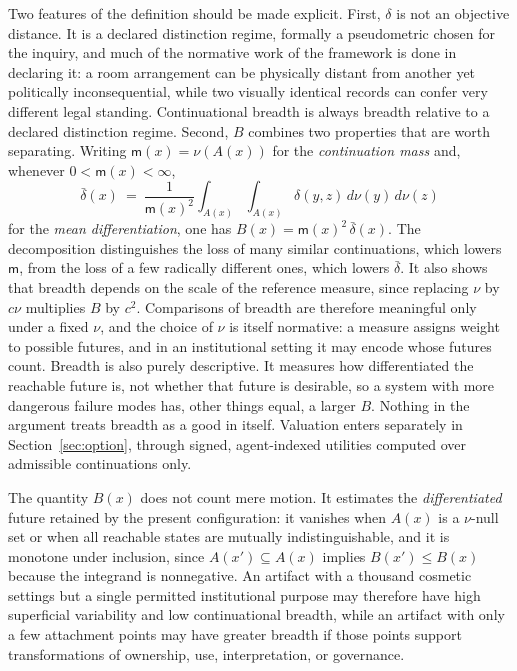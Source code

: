 Two features of the definition should be made explicit. First, $\delta$ is not an objective distance. It is a declared distinction regime, formally a pseudometric chosen for the inquiry, and much of the normative work of the framework is done in declaring it: a room arrangement can be physically distant from another yet politically inconsequential, while two visually identical records can confer very different legal standing. Continuational breadth is always breadth relative to a declared distinction regime. Second, $B$ combines two properties that are worth separating. Writing $\mathsf{m}(x)=\nu(A(x))$ for the \emph{continuation mass} and, whenever $0<\mathsf{m}(x)<\infty$,
\begin{equation}\label{eq:mean-diff}
\bar\delta(x)\ =\ \frac{1}{\mathsf{m}(x)^2}\int_{A(x)}\int_{A(x)}\delta(y,z)\,d\nu(y)\,d\nu(z)
\end{equation}
for the \emph{mean differentiation}, one has $B(x)=\mathsf{m}(x)^2\,\bar\delta(x)$. The decomposition distinguishes the loss of many similar continuations, which lowers $\mathsf{m}$, from the loss of a few radically different ones, which lowers $\bar\delta$. It also shows that breadth depends on the scale of the reference measure, since replacing $\nu$ by $c\nu$ multiplies $B$ by $c^2$. Comparisons of breadth are therefore meaningful only under a fixed $\nu$, and the choice of $\nu$ is itself normative: a measure assigns weight to possible futures, and in an institutional setting it may encode whose futures count. Breadth is also purely descriptive. It measures how differentiated the reachable future is, not whether that future is desirable, so a system with more dangerous failure modes has, other things equal, a larger $B$. Nothing in the argument treats breadth as a good in itself. Valuation enters separately in Section~\ref{sec:option}, through signed, agent-indexed utilities computed over admissible continuations only.

The quantity $B(x)$ does not count mere motion. It estimates the \emph{differentiated} future retained by the present configuration: it vanishes when $A(x)$ is a $\nu$-null set or when all reachable states are mutually indistinguishable, and it is monotone under inclusion, since $A(x')\subseteq A(x)$ implies $B(x')\leq B(x)$ because the integrand is nonnegative. An artifact with a thousand cosmetic settings but a single permitted institutional purpose may therefore have high superficial variability and low continuational breadth, while an artifact with only a few attachment points may have greater breadth if those points support transformations of ownership, use, interpretation, or governance.

